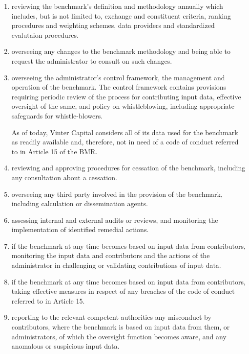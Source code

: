 \documentclass{article}
\begin{document}
\begin{enumerate}[label=\alph*)]
    \item reviewing the benchmark's definition and methodology annually which includes, but is not limited to, exchange and constituent criteria, ranking procedures and weighting schemes, data providers and standardized evalutaion procedures.
    \item overseeing any changes to the benchmark methodology and being able to request the administrator to consult on such changes.
    \item overseeing the administrator's control framework, the management and operation of the benchmark. The control framework contains provisions requiring periodic review of the process for contributing input data, effective oversight of the same, and policy on whistleblowing, including appropriate safeguards for whistle-blowers.
    
    As of today, Vinter Capital considers all of its data used for the benchmark as readily available and, therefore, not in need of a code of conduct referred to in Article 15 of the BMR.
    \item reviewing and approving procedures for cessation of the benchmark, including any consultation about a cessation.
    \item overseeing any third party involved in the provision of the benchmark, including calculation or dissemination agents.
    \item assessing internal and external audits or reviews, and monitoring the implementation of identified remedial actions.
    \item if the benchmark at any time becomes based on input data from contributors, monitoring the input data and contributors and the actions of the administrator in challenging or validating contributions of input data.
    \item if the benchmark at any time becomes based on input data from contributors, taking effective measures in respect of any breaches of the code of conduct referred to in Article 15.
    \item reporting to the relevant competent authorities any misconduct by contributors, where the benchmark is based on input data from them, or administrators, of which the oversight function becomes aware, and any anomalous or suspicious input data.
\end{enumerate}
\end{document}
